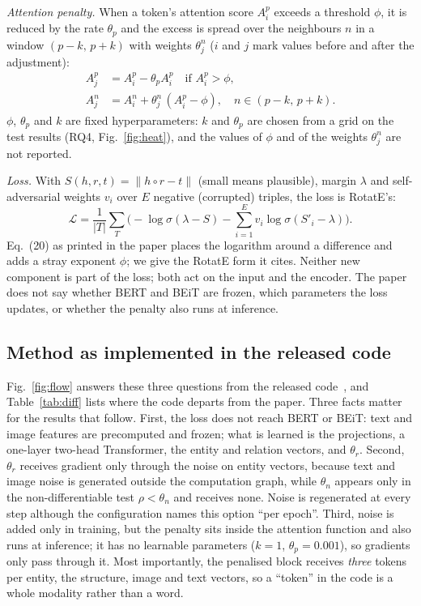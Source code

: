 \documentclass[conference,a4paper]{IEEEtran}
\begin{document}
\emph{Attention penalty.} When a token's attention score $A^p_i$ exceeds a threshold
$\phi$, it is reduced by the rate $\theta_p$ and the excess is spread over the neighbours
$n$ in a window $(p-k,\,p+k)$ with weights $\theta^n_j$ ($i$ and $j$ mark values before and
after the adjustment):
\begin{align}
A^p_j &= A^p_i-\theta_p A^p_i \quad \text{if } A^p_i>\phi, \tag{9}\\
A^n_j &= A^n_i+\theta^n_j\,(A^p_i-\phi),\quad n\in(p-k,\,p+k). \tag{10}
\end{align}
$\phi$, $\theta_p$ and $k$ are fixed hyperparameters: $k$ and $\theta_p$ are chosen from a
grid on the test results (RQ4, Fig.~\ref{fig:heat}), and the values of $\phi$ and of the
weights $\theta^n_j$ are not reported.

\emph{Loss.} With $S(h,r,t)=\lVert h\circ r-t\rVert$ (small means plausible), margin
$\lambda$ and self-adversarial weights $v_i$ over $E$ negative (corrupted) triples, the loss
is RotatE's:
\begin{equation}
\mathcal{L}=\frac{1}{|T|}\sum_{T}\Big(-\log\sigma(\lambda-S)-\sum_{i=1}^{E}v_i\log\sigma(S'_i-\lambda)\Big). \tag{20}
\end{equation}
Eq.~(20) as printed in the paper places the logarithm around a difference and adds a
stray exponent $\phi$; we give the RotatE form it cites.
Neither new component is part of the loss; both act on the input and the encoder. The
paper does not say whether BERT and BEiT are frozen, which parameters the loss updates, or
whether the penalty also runs at inference.

\subsection{Method as implemented in the released code}
\label{sec:flow}
Fig.~\ref{fig:flow} answers these three questions from the released code~\cite{apkgcrepo},
and Table~\ref{tab:diff} lists where the code departs from the paper. Three facts matter
for the results that follow. First, the loss does not reach BERT or BEiT: text and image
features are precomputed and frozen; what is learned is
the projections, a one-layer two-head Transformer, the entity and relation vectors, and
$\theta_r$. Second, $\theta_r$ receives gradient only through the noise on entity vectors,
because text and image noise is generated outside the computation graph, while $\theta_n$
appears only in the non-differentiable test $\rho<\theta_n$ and receives none. Noise is
regenerated at every step although the configuration names this option ``per epoch''. Third,
noise is added only in training, but the penalty sits inside the attention function and
also runs at inference; it has no learnable parameters ($k=1$, $\theta_p=0.001$), so
gradients only pass through it. Most importantly, the penalised block receives
\emph{three} tokens per entity, the structure, image and text vectors, so a ``token'' in
the code is a whole modality rather than a word.
\end{document}
